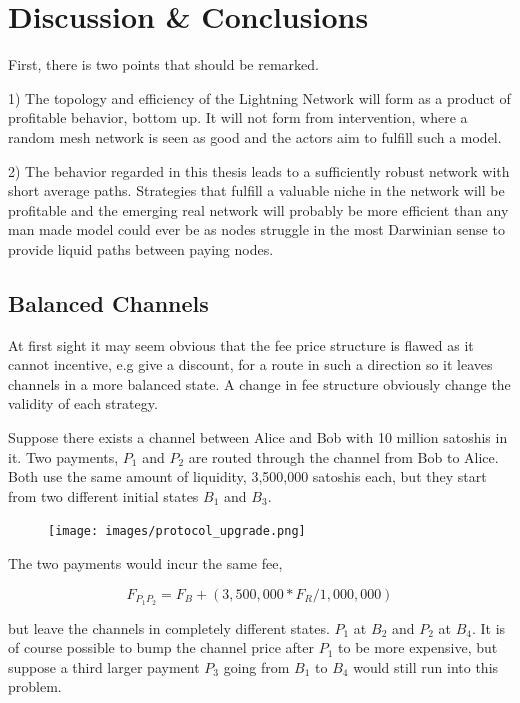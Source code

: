 \chapter{Discussion \& Conclusions}

First, there is two points that should be remarked.
 
1) The topology and efficiency of the \gls{Lightning Network} will form as a product of profitable behavior, bottom up. It will not form from intervention, where a random mesh network is seen as good and the actors aim to fulfill such a model.
 
2) The behavior regarded in this thesis leads to a sufficiently robust network with short average paths. Strategies that fulfill a valuable niche in the network will be profitable and the emerging real network will probably be more efficient than any man made model could ever be as nodes struggle in the most Darwinian sense to provide liquid paths between paying nodes.

\section{Balanced Channels}

At first sight it may seem obvious that the fee price structure is flawed as it cannot incentive, e.g give a discount, for a route in such a direction so it leaves channels in a more balanced state. A change in fee structure obviously change the validity of each strategy.

Suppose there exists a channel between Alice and Bob with 10 million satoshis in it. 
Two payments, $P_{1}$ and $P_{2}$ are routed through the channel from Bob to Alice.
Both use the same amount of liquidity, 3,500,000 satoshis each, but they start from two different initial states $B_{1}$ and $B_3$.

\begin{figure}[!htb]
	\hspace*{0.7cm} 
	\centering
	\texttt{[image: images/protocol\_upgrade.png]}
	
	\label{fig:upgrade}
	\hspace*{2mm} 	
\end{figure}

The two payments would incur the same fee, 

\[ F_{P_1 P_2} = F_B + (3,500,000 * F_R / 1,000,000) \]

but leave the channels in completely different states. $P_1$ at $B_2$ and $P_2$ at $B_4$. It is of course possible to bump the channel price after $P_1$ to
be more expensive, but suppose a third larger payment $P_3$ going from $B_1$ to $B_4$ would still run into this problem.

